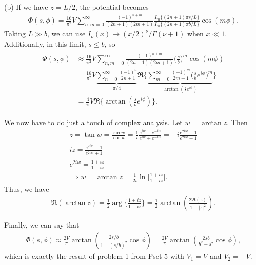 {(b) If we have $z = L/2$, the potential becomes
\begin{eqnarray}
    \Phi(s,\phi) = \frac{16}{\pi^2} V \sum_{n,m=0}^{\infty} \frac{(-1)^{n+m}}{(2n+1)(2m+1)} \frac{I_{m}\{ (2n+1)\pi s/L \}}{I_{m}\{ (2n+1) \pi b/L \}} \cos(m\phi)
.\end{eqnarray}
Taking $L \gg b$, we can use $I_{\nu}(x) \rightarrow (x/2)^{\nu}/\Gamma(\nu+1)$ when $x \ll 1$.
Additionally, in this limit, $s \leq b$, so
\begin{eqnarray}
\begin{aligned}
    \Phi(s,\phi) &\approx \frac{16}{\pi^2} V \sum_{n,m=0}^{\infty} \frac{(-1)^{n+m}}{(2n+1)(2m+1)} \Big( \frac{s}{b} \Big)^{m} \cos(m\phi) \\
                 &= \frac{16}{\pi^2} V \underbrace{ \sum_{n=0}^{\infty} \frac{(-1)^{n}}{2n+1} }_{\pi/4} \Re\Bigg\{ \underbrace{ \sum_{m=0}^{\infty} \frac{(-1)^{m}}{2m+1} \Big( \frac{s}{b} e^{i\phi} \Big)^{m} }_{ \arctan( \frac{s}{b}e^{i\phi}) } \Bigg\} \\
                 &= \frac{4}{\pi} V \Re\Bigg\{ \arctan(\frac{s}{b} e^{i\phi}) \Bigg\}
.\end{aligned}
\end{eqnarray}

We now have to do just a touch of complex analysis.
Let $w = \arctan{z}$.
Then
\begin{gather}
    z = \tan{w} = \frac{\sin{w}}{\cos{w}} = \frac{1}{i}\frac{e^{iw} - e^{-iw}}{e^{iw} + e^{-iw}} = -i \frac{e^{2iw} - 1}{e^{2iw} + 1} \\
    iz = \frac{e^{2iw} - 1}{e^{2iw} + 1} \\
    e^{2iw} = \frac{1 + iz}{1 - iz} \\
    \Rightarrow w = \arctan{z} = \frac{1}{2i} \ln\Big[ \frac{1 + iz}{1 - iz} \Big]
.\end{gather}
Thus, we have
\begin{eqnarray}
    \Re(\arctan{z}) = \frac{1}{2} \arg\Bigg\{ \frac{1 + iz}{1 - iz} \Bigg\} = \frac{1}{2} \arctan(\frac{2\Re(z)}{1 - |z|^2})
.\end{eqnarray}

Finally, we can say that
\begin{eqnarray}
    \Phi(s,\phi) \approx \frac{2V}{\pi} \arctan( \frac{2s/b}{1 - (s/b)^2} \cos{\phi} ) = \frac{2V}{\pi} \arctan( \frac{2sb}{b^2 - s^2} \cos{\phi} )
,\end{eqnarray}
which is exactly the result of problem 1 from Pset 5 with $V_1 = V$ and $V_2 = -V$.


}


